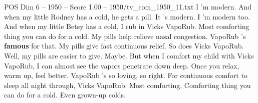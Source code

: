 \begin{textsample}{POS Dim 6 – 1950 – Score 1.00 – 1950/tv\_com\_1950\_11.txt}  \label{ex:f6_pos_014}
I 'm modern.
And when my little Rodney has a cold, he gets a pill.
It 's modern.
I 'm modern too.
And when my little Betsy has a cold, I rub in Vicks VapoRub.
Most comforting thing you can do for a cold.
My pills help relieve nasal congestion.
VapoRub 's \textbf{famous} for that.
My pills give fast continuous relief.
So does Vicks VapoRub.
Well, my pills are easier to give.
Maybe.
But when I comfort my child with Vicks VapoRub, I can almost see the vapors penetrate down deep.
Once you relax, warm up, feel better.
VapoRub 's so loving, so right.
For continuous comfort to sleep all night through, Vicks VapoRub.
Most comforting.
Comforting thing you can do for a cold.
Even grown-up colds.

\end{textsample}
